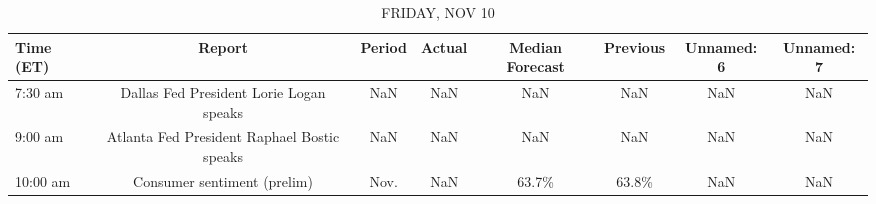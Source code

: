 \documentclass{article}%
\begin{document}
%


\begin{table}[htbp]%
\caption{FRIDAY, NOV 10}%
\centering%
\begin{adjustbox}{width=1\textwidth}%
\begin{tabular}{lccccccc}
\toprule
Time (ET) &                                      Report & Period & Actual & Median Forecast & Previous & Unnamed: 6 & Unnamed: 7 \\
\midrule
  7:30 am &     Dallas Fed President Lorie Logan speaks &    NaN &    NaN &             NaN &      NaN &        NaN &        NaN \\
  9:00 am & Atlanta Fed President Raphael Bostic speaks &    NaN &    NaN &             NaN &      NaN &        NaN &        NaN \\
 10:00 am &                 Consumer sentiment (prelim) &   Nov. &    NaN &           63.7\% &    63.8\% &        NaN &        NaN \\
\bottomrule
\end{tabular}
%
\end{adjustbox}%
\end{table}
\end{document}
